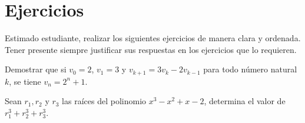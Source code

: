 \section*{Ejercicios}

Estimado estudiante, realizar los siguientes ejercicios de manera clara y ordenada.
Tener presente siempre justificar sus respuestas en los ejercicios que lo requieren.

\vspace{0.5cm}

\hline

\begin{exercise}
    Demostrar que si $v_0 = 2$, $v_1 = 3$ y $v_{k + 1} = 3v_k - 2 v_{k - 1}$ para todo número natural $k$, se tiene $v_n = 2^n + 1$.
\end{exercise}

\begin{exercise}
    Sean $r_1, r_2$ y $r_3$ las raíces del polinomio $x^3 - x^2 + x - 2$, determina el valor de $r_1^3 + r_2^3 + r_3^3$.
\end{exercise}

\hline
